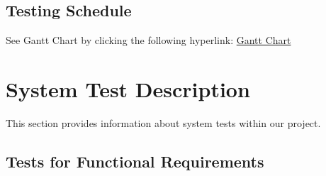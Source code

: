 \documentclass[12pt, titlepage]{article}
\begin{document}
\subsection{Testing Schedule}
		
See Gantt Chart by clicking the following hyperlink: 
\href{https://gitlab.cas.mcmaster.ca/dimitn/image_processing_app/tree/master/ProjectSchedule}{Gantt Chart}

\section{System Test Description}

This section provides information about system tests within our project.
	
\subsection{Tests for Functional Requirements}
\end{document}
